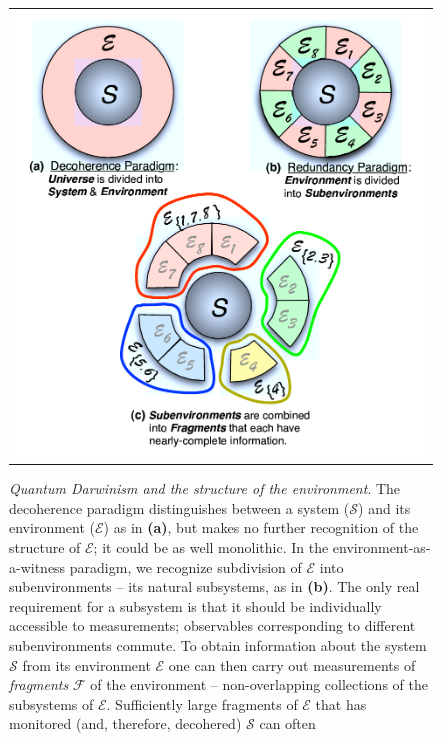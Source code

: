 \documentclass[aps,twocolumn,rmp,epsfig]{revtex4}
\newcommand{\Sys}{\ensuremath{\mathcal{S}}}
\newcommand{\Env}{\ensuremath{\mathcal{E}}}
\def\FCW{0.98\columnwidth}
\newcommand{\cS}        {{\mathcal S}}
\newcommand{\cE}        {{\mathcal E}}
\newcommand{\+}         {\dagger}
\newcommand\cF{{\mathcal F}}
\begin{document}
\begin{figure}[tb]
\begin{tabular}{l}
\vspace{-0.15in} \includegraphics[width=\FCW]{EnvSubdivision.pdf}\\
\end{tabular}
\caption{\emph{Quantum Darwinism and the structure of the environment}.  The decoherence paradigm distinguishes between a system ($\Sys$) and its environment ($\Env$) as in \textbf{(a)}, but makes no further recognition of the structure of $\cE$; it could be as well monolithic.  In the environment-as-a-witness paradigm, we recognize subdivision of $\Env$ into subenvironments -- its natural subsystems, as in \textbf{(b)}. The only real requirement for a subsystem is that it should be individually accessible to measurements; observables corresponding to different subenvironments commute. To obtain information about the system $\cS$ from its environment $\cE$ one can then carry out measurements 
of \emph{fragments} $\cF$ of the environment -- non-overlapping collections of the subsystems of $\cE$.  Sufficiently large fragments of $\cE$ that has monitored (and, therefore, decohered) $\cS$ can often 
}
\end{figure}
\end{document}
